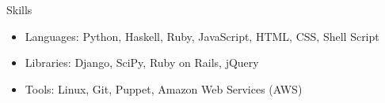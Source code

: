 \documentclass[11pt,oneside]{article}
\newenvironment{ressection}[1]{
    \textrm{\Large#1}
    \begin{itemize}
}{
    \end{itemize}
}
\newcommand{\resitem}[1]{
    \item \begin{flushleft} \textsf{#1} \end{flushleft}
}
\begin{document}
\begin{ressection}{Skills}
    \resitem{
        \textrm{Languages:}
        Python,
        Haskell,
        Ruby,
        JavaScript,
        HTML,
        CSS,
        Shell Script
    }

    \resitem{
        \textrm{Libraries:}
        Django,
        SciPy,
        Ruby on Rails,
        jQuery
    }

    \resitem{
        \textrm{Tools:}
        Linux,
        Git,
        Puppet,
        Amazon Web Services (AWS)
    }
\end{ressection}
\end{document}
